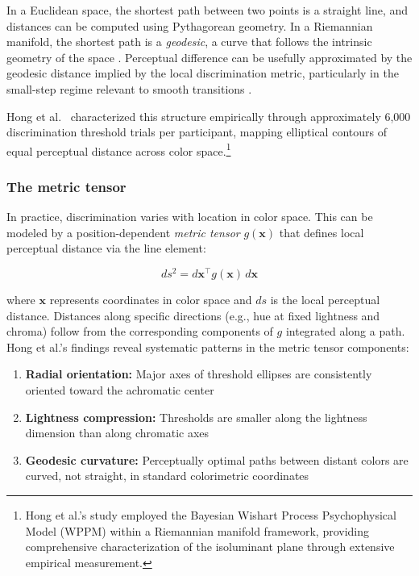 In a Euclidean space, the shortest path between two points is a straight line, and distances can be computed using Pythagorean geometry. In a Riemannian manifold, the shortest path is a \emph{geodesic}, a curve that follows the intrinsic geometry of the space \citep{hong2025}. Perceptual difference can be usefully approximated by the geodesic distance implied by the local discrimination metric, particularly in the small-step regime relevant to smooth transitions \citep{hong2025}.

Hong et al.\ \citeyearpar{hong2025} characterized this structure empirically through approximately 6,000 discrimination threshold trials per participant, mapping elliptical contours of equal perceptual distance across color space.\footnote{Hong et al.'s study employed the Bayesian Wishart Process Psychophysical Model (WPPM) within a Riemannian manifold framework, providing comprehensive characterization of the isoluminant plane through extensive empirical measurement.}

\subsubsection*{The metric tensor}

In practice, discrimination varies with location in color space. This can be modeled by a position-dependent \emph{metric tensor} $g(\mathbf{x})$ that defines local perceptual distance via the line element:

\begin{equation}
ds^2 = d\mathbf{x}^\top g(\mathbf{x})\, d\mathbf{x}
\label{eq:line-element}
\end{equation}

\noindent where $\mathbf{x}$ represents coordinates in color space and $ds$ is the local perceptual distance. Distances along specific directions (e.g., hue at fixed lightness and chroma) follow from the corresponding components of $g$ integrated along a path. Hong et al.'s findings reveal systematic patterns in the metric tensor components:

\begin{enumerate}
    \item \textbf{Radial orientation:} Major axes of threshold ellipses are consistently oriented toward the achromatic center \citep{hong2025}
    \item \textbf{Lightness compression:} Thresholds are smaller along the lightness dimension than along chromatic axes
    \item \textbf{Geodesic curvature:} Perceptually optimal paths between distant colors are curved, not straight, in standard colorimetric coordinates
\end{enumerate}


